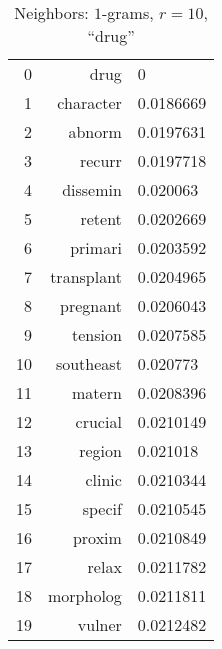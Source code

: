 \begin{table}[t]
\begin{subtable}[t]{.45\textwidth}
\begin{tabularx}{\textwidth}{r R l}
            \midrule
            \num{0} & drug & \num{0}\\
            \num{1} & character & \num{0.0186669}\\
            \num{2} & abnorm & \num{0.0197631}\\
            \num{3} & recurr & \num{0.0197718}\\
            \num{4} & dissemin & \num{0.020063}\\
            \num{5} & retent & \num{0.0202669}\\
            \num{6} & primari & \num{0.0203592}\\
            \num{7} & transplant & \num{0.0204965}\\
            \num{8} & pregnant & \num{0.0206043}\\
            \num{9} & tension & \num{0.0207585}\\
            \num{10} & southeast & \num{0.020773}\\
            \midrule
            \num{11} & matern & \num{0.0208396}\\
            \num{12} & crucial & \num{0.0210149}\\
            \num{13} & region & \num{0.021018}\\
            \num{14} & clinic & \num{0.0210344}\\
            \num{15} & specif & \num{0.0210545}\\
            \num{16} & proxim & \num{0.0210849}\\
            \num{17} & relax & \num{0.0211782}\\
            \num{18} & morpholog & \num{0.0211811}\\
            \num{19} & vulner & \num{0.0212482}\\
            \bottomrule
        \end{tabularx}
        \caption{$[129,256]$}\label{tab:ranking_drug_secondhalf}
    \end{subtable}
    \caption[Neighbors of \enquote{drug}, full and half range]{Neighbors: $1$-grams, $r = 10$, \enquote{drug}}\label{tab:ranking_drug_sane}
\end{table}

